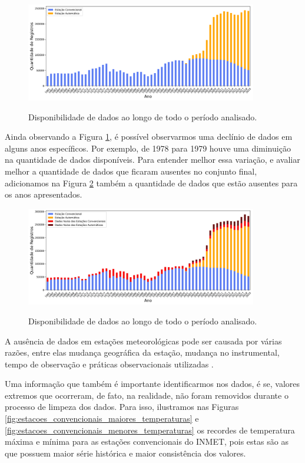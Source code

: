 \begin{figure}[H]
    \centering
    \caption{Disponibilidade de dados ao longo de todo o período analisado.}
    \includegraphics[width=0.9\textwidth]{figuras/disponibilizade_historica_de_dados.png}
    \label{fig:disponibilidade_historica_de_dados}
\end{figure}

Ainda observando a Figura \ref{fig:disponibilidade_historica_de_dados}, é possível observarmos uma declínio de dados em alguns anos específicos. Por exemplo, de 1978 para 1979 houve uma diminuição na quantidade de dados disponíveis. Para entender melhor essa variação, e avaliar melhor a quantidade de dados que ficaram ausentes no conjunto final, adicionamos na Figura \ref{fig:dados_ausentes_ao_longo_anos} também a quantidade de dados que estão ausentes para os anos apresentados.

\begin{figure}[H]
    \centering
    \caption{Disponibilidade de dados ao longo de todo o período analisado.}
    \includegraphics[width=0.9\textwidth]{figuras/dados_ausentes_ao_longo_anos.png}
    \label{fig:dados_ausentes_ao_longo_anos}
\end{figure}

A ausência de dados em estações meteorológicas pode ser causada por várias razões, entre elas mudança geográfica da estação, mudança no instrumental, tempo de observação e práticas observacionais utilizadas \cite{oliveira2019estaccao}. 

Uma informação que também é importante identificarmos nos dados, é se, valores extremos que ocorreram, de fato, na realidade, não foram removidos durante o processo de limpeza dos dados.
Para isso, ilustramos nas Figuras \ref{fig:estacoes_convencionais_maiores_temperaturas} e \ref{fig:estacoes_convencionais_menores_temperaturas} os recordes de temperatura máxima e mínima para as estações convencionais do INMET, pois estas são as que possuem maior série histórica e maior consistência dos valores. 

